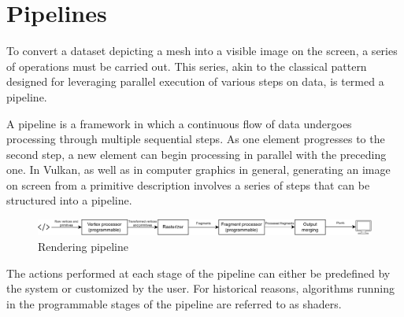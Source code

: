 \section{Pipelines}

To convert a dataset depicting a mesh into a visible image on the screen, a series of operations must be carried out. 
This series, akin to the classical pattern designed for leveraging parallel execution of various steps on data, is termed a pipeline.

A pipeline is a framework in which a continuous flow of data undergoes processing through multiple sequential steps. 
As one element progresses to the second step, a new element can begin processing in parallel with the preceding one.
In Vulkan, as well as in computer graphics in general, generating an image on screen from a primitive description involves a series of steps that can be structured into a pipeline.
\begin{figure}[H]
    \centering
    \includegraphics[width=1\linewidth]{images/pipeline.png}
    \caption{Rendering pipeline}
\end{figure}
The actions performed at each stage of the pipeline can either be predefined by the system or customized by the user.
For historical reasons, algorithms running in the programmable stages of the pipeline are referred to as shaders.

